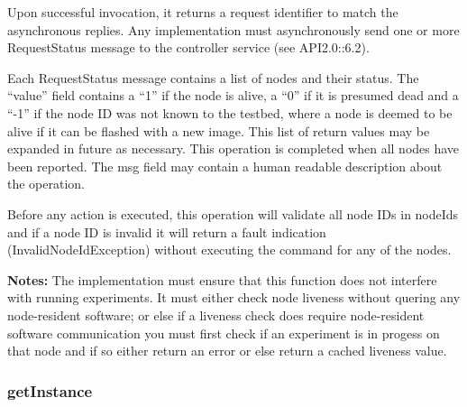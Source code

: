 Upon successful invocation, it returns a request identifier to match the asynchronous replies. Any implementation must asynchronously send one or more RequestStatus message to the controller service (see API2.0::6.2).

Each RequestStatus message contains a list of nodes and their status. The ``value'' field contains a ``1'' if the node is alive, a ``0'' if it is presumed dead and a ``-1'' if the node ID was not known to the testbed, where a node is deemed to be alive if it can be flashed with a new image. This list of return values may be expanded in future as necessary. This operation is completed when all nodes have been reported. The msg field may contain a human readable description about the operation. 

Before any action is executed, this operation will validate all node IDs in nodeIds and if a node ID is invalid it will return a fault indication (InvalidNodeIdException) without executing the command for any of the nodes.

{\bf Notes:} The implementation must ensure that this function does not interfere with running experiments. It must either check node liveness without quering any node-resident software; or else if a liveness check does require node-resident software communication you must first check if an experiment is in progess on that node and if so either return an error or else return a cached liveness value.

			\subsubsection{getInstance}

